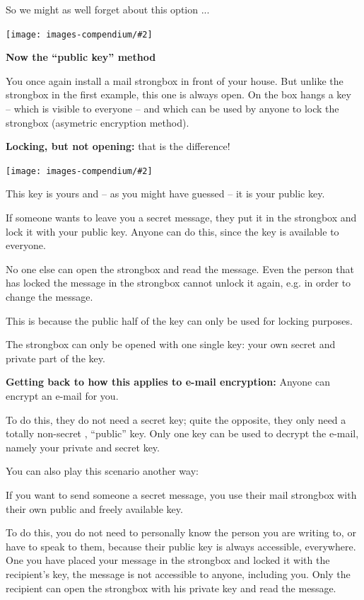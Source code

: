 \documentclass[a4paper,11pt,oneside,openright,titlepage]{scrbook}
\newcommand{\Email}{e-mail}
\newcommand{\IncludeImage}[2][]{
\begin{center}
  \texttt{[image: images-compendium/\#2]}%
\end{center}
}
\begin{document}
So we might as well forget about this option ...


\IncludeImage[width=0.75\textwidth]{letter-out-of-safe}

\clearpage
\textbf{Now the ``public key'' method}

You once again install a mail strongbox in front of
your house. But unlike the strongbox in the first example, this one
is always open. On the box hangs a key --­ which is visible to
everyone -- and which can be used by anyone to lock the strongbox
(asymetric encryption method).

\textbf{Locking, but not opening:} that is the difference!


\IncludeImage[width=0.7\textwidth]{pk-safe-open}

This key is yours and -- as you might have guessed -- it is your public key.

If someone wants to leave you a secret message, they put it in the
strongbox and lock it with your public key. Anyone can do this, since
the key is available to everyone.

No one else can open the strongbox
and read the message.  Even the person that has locked the message in
the strongbox cannot unlock it again, e.g. in order to change the
message.

This is because the public half of the key can only be used for locking purposes.

The strongbox can only be opened with one single key: your own secret
and private part of the key.

\clearpage
\textbf{Getting back to how this applies to \Email{} encryption:}
Anyone can encrypt an \Email{} for you.

To do this, they do not need a secret key; quite the opposite, they
only need a totally non-secret , ``public'' key.
Only one key can be used to decrypt the \Email{}, namely your private
and secret key.

You can also play this scenario another way:

If you want to send someone a secret message, you use their mail
strongbox with their own public and freely available key.

To do this, you do not need to personally know the person you are
writing to, or have to speak to them, because their public key is
always accessible, everywhere. One you have placed your message in the
strongbox and locked it with the recipient's key, the message is not
accessible to anyone, including you. Only the recipient can open the
strongbox with his private key and read the message.
\end{document}
